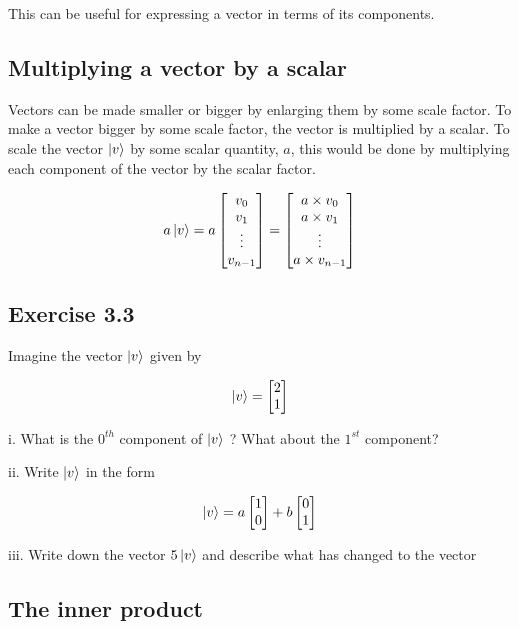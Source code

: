 \documentclass{book}
\begin{document}
This can be useful for expressing a vector in terms of its components. 

\subsection{ Multiplying a vector by a scalar }

Vectors can be made smaller or bigger by enlarging them by some scale factor. To make a vector bigger by some scale factor, the vector is multiplied by a scalar. To scale the vector $\ket{v}$ by some scalar quantity, $a$, this would be done by multiplying each component of the vector by the scalar factor. 

$$
a \ket{v} = a\begin{bmatrix} v_0 \\ v_1 \\ \vdots \\ v_{n-1} \end{bmatrix} = \begin{bmatrix} a \times v_0 \\ a \times v_1 \\ \vdots \\ a \times v_{n-1} \end{bmatrix} 
$$
\hlint
\subsection{Exercise 3.3}

Imagine the vector $\ket{v}$ given by 

$$\ket{v} = \begin{bmatrix} 2 \\ 1 \end{bmatrix}$$

i. What is the $0^{th}$ component of $\ket{v}$ ? What about the $1^{st}$ component?

ii. Write $\ket{v}$ in the form 

$$
\ket{v} = a\begin{bmatrix} 1 \\ 0 \end{bmatrix} + b \begin{bmatrix} 0 \\ 1 \end{bmatrix}
$$

iii. Write down the vector $5\ket{v}$ and describe what has changed to the vector  

\hline
\subsection{The inner product}
\end{document}
